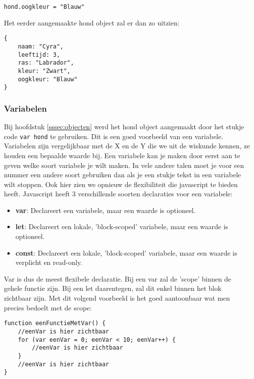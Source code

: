 \begin{lstlisting}[frame=single, caption=Eigenschap toevoegen aan en object]
hond.oogkleur = "Blauw"
\end{lstlisting}

Het eerder aangemaakte hond object zal er dan zo uitzien:

\begin{lstlisting}[frame=single, caption=Het nieuwe hond object]
{
	naam: "Cyra",
 	leeftijd: 3,
 	ras: "Labrador",
 	kleur: "Zwart",
 	oogkleur: "Blauw"
}
\end{lstlisting}

\subsubsection{Variabelen}
\label{sssec:variabelen}
Bij hoofdstuk \ref{sssec:objecten} werd het hond object aangemaakt door het stukje code \lstinline[basicstyle=\ttfamily\color{red}]|var hond| te gebruiken. Dit is een goed voorbeeld van een variabele. Variabelen zijn vergelijkbaar met de X en de Y die we uit de wiskunde kennen, ze houden een bepaalde waarde bij. Een variabele kan je maken door eerst aan te geven welke soort variabele je wilt maken. In vele andere talen moet je voor een nummer een andere soort gebruiken dan als je een stukje tekst in een variabele wilt stoppen. Ook hier zien we opnieuw de flexibiliteit die javascript te bieden heeft. Javascript heeft 3 verschillende soorten declaraties voor een variabele:

\begin{itemize}
	\item \textbf{var}: Declareert een variabele, maar een waarde is optioneel.
	\item \textbf{let}: Declareert een lokale, 'block-scoped' variabele, maar een waarde is optioneel.
	\item \textbf{const}: Declareert een lokale, 'block-scoped' variabele, maar een waarde is verplicht en read-only.
\end{itemize}

Var is dus de meest flexibele declaratie. Bij een var zal de 'scope' binnen de gehele functie zijn. Bij een let daarentegen, zal dit enkel binnen het blok zichtbaar zijn. Met dit volgend voorbeeld is het goed aantoonbaar wat men precies bedoelt met de scope:

\begin{lstlisting}[frame=single, caption=Een functie met var]
function eenFunctieMetVar() {
	//eenVar is hier zichtbaar
	for (var eenVar = 0; eenVar < 10; eenVar++) {
		//eenVar is hier zichtbaar
	}
	//eenVar is hier zichtbaar
}
\end{lstlisting}

